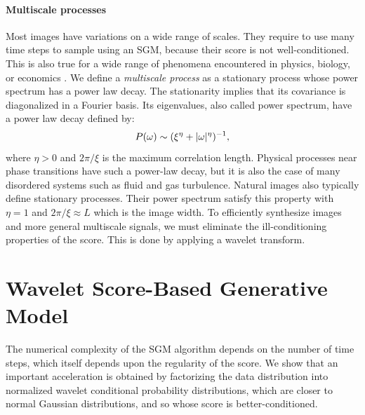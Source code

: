 \documentclass{article}
\begin{document}
\paragraph{Multiscale processes}
 Most images have variations on a wide range of scales.  They require to use
 many time steps to sample using an SGM, because their score is not well-conditioned.
 This is also true for a wide range of phenomena encountered in physics,
 biology, or economics \citep{kolmogorov_1962,mandelbrot1983fractal}.  We define a \emph{multiscale
 process} as a stationary process whose power spectrum has a power law
 decay. The stationarity implies that its covariance is diagonalized in a
 Fourier basis.  Its eigenvalues, also called power spectrum, have a power law
 decay defined by:
\begin{equation}\label{eq:power_law_spectrum}
P({\omega}) \sim (\xi^\eta + |{\omega}|^\eta)^{-1} ,
\end{equation}
where $\eta > 0$ and $2 \pi/\xi$ is the maximum correlation length. 
Physical processes near phase transitions have such a power-law decay, but it is also the case of many disordered systems such as fluid and gas turbulence. 
Natural images also typically define stationary processes. Their power spectrum satisfy this property with $\eta = 1$
and $2\pi / \xi \approx L$ which is the image width.
To efficiently synthesize images and more general multiscale signals, we must eliminate
the ill-conditioning properties of the score. This is done by applying a wavelet transform.

\section{Wavelet Score-Based Generative Model}
\label{sec:wavel-diff-score}

The numerical complexity of the SGM algorithm depends on the number of time steps,
which itself depends upon the regularity of the score.  
We show that an important acceleration is obtained by
factorizing the data distribution into normalized wavelet conditional
probability distributions, which are closer to normal Gaussian
distributions, and so whose score is better-conditioned. 
  
\end{document}

